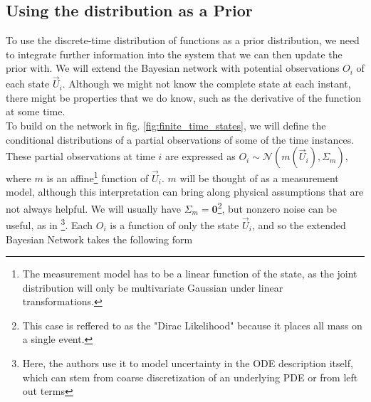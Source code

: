 \subsection*{Using the distribution as a Prior}
To use the discrete-time distribution of functions as a prior distribution, we need to integrate further information into the system that we can then update the prior with. We will extend the Bayesian network with potential observations $O_i$ of each state $\vec{U}_i$. Although we might not know the complete state at each instant, there might be properties that we do know, such as the derivative of the function at some time. 
\\ To build on the network in fig. \ref{fig:finite_time_states}, we will define the conditional distributions of a partial observations of some of the time instances. These partial observations at time $i$ are expressed as $O_i \sim \mathcal{N}(m(\vec{U}_i), \Sigma_m)$, where $m$ is an affine\footnote{The measurement model has to be a linear function of the state, as the joint distribution will only be multivariate Gaussian under linear transformations.} function of $\vec{U}_i$. $m$ will be thought of as a measurement model, although this interpretation can bring along physical assumptions that are not always helpful. We will usually have $\Sigma_m = \mathbf{0}$\footnote{This case is reffered to as the "Dirac Likelihood" \cite{exponential_probabilistic} because it places all mass on a single event.}, but nonzero noise can be useful, as in \cite{pnmol}\footnote{Here, the authors use it to model uncertainty in the ODE description itself, which can stem from coarse discretization of an underlying PDE or from left out terms}.
Each $O_i$ is a function of only the state $\vec{U}_i$, and so the extended Bayesian Network takes the following form
